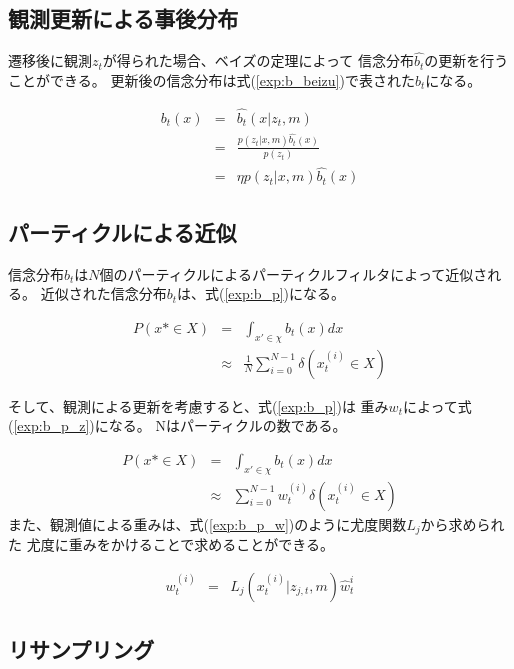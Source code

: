 \subsection{観測更新による事後分布}

遷移後に観測$z_t$が得られた場合、ベイズの定理によって
信念分布$\hat{b_t}$の更新を行うことができる。
更新後の信念分布は式(\ref{exp:b_beizu})で表された$b_t$になる。

\begin{eqnarray}
  \label{exp:b_beizu}
  b_t(x) &=& \hat{b_t}(x|z_t, m) \nonumber \\
  &=& \frac{p(z_t|x, m)\hat{b_t}(x)}{p(z_t)} \nonumber \\
  &=& \eta p(z_t|x, m)\hat{b_t}(x)
\end{eqnarray}

\subsection{パーティクルによる近似}

信念分布$b_t$は$N$個のパーティクルによるパーティクルフィルタによって近似される。
近似された信念分布$b_t$は、式(\ref{exp:b_p})になる。

\begin{eqnarray}
  \label{exp:b_p}
  P(x*\in X) &=& \int_{x'\in\chi}b_t(x)dx \nonumber \\
  &\approx& \frac{1}{N} \sum_{i=0}^{N-1} \delta (x^{(i)}_{t} \in X)
\end{eqnarray}

そして、観測による更新を考慮すると、式(\ref{exp:b_p})は
重み$w_t$によって式(\ref{exp:b_p_z})になる。
Nはパーティクルの数である。

\begin{eqnarray}
  \label{exp:b_p_z}
  P(x*\in X) &=& \int_{x'\in\chi}b_t(x)dx \nonumber \\
  &\approx& \sum_{i=0}^{N-1} w^{(i)}_{t} \delta (x^{(i)}_{t} \in X)
\end{eqnarray}
また、観測値による重みは、式(\ref{exp:b_p_w})のように尤度関数$L_j$から求められた
尤度に重みをかけることで求めることができる。

\begin{eqnarray}
  \label{exp:b_p_w}
  w_{t}^{(i)} &=& L_j(x_{t}^{(i)} | z_{j, t}, m)\hat{w}_{t}^{i}
\end{eqnarray}

\subsection{リサンプリング}

